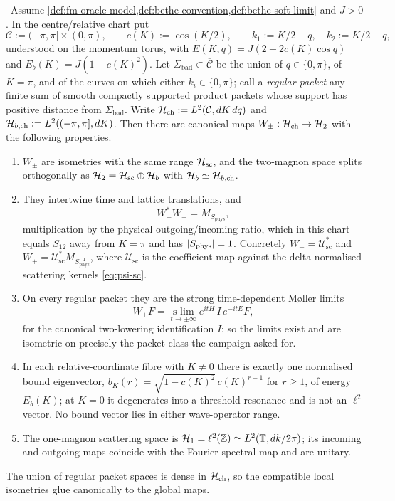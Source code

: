 \begin{theorem}
\label{thm:two-magnon-wave-operators}
\statusProved\ Assume \cref{def:fm-oracle-model,def:bethe-convention,def:bethe-soft-limit}
and $J>0$. In the centre/relative chart put
\begin{equation}
  \mathcal{C}:=(-\pi,\pi]\times(0,\pi),\qquad c(K):=\cos(K/2),\qquad
  k_1:=K/2-q,\quad k_2:=K/2+q,
\end{equation}
understood on the momentum torus, with $E(K,q)=J(2-2c(K)\cos q)$ and
$E_b(K)=J(1-c(K)^2)$. Let $\Sigma_{\mathrm{bad}}\subset\overline{\mathcal{C}}$
be the union of $q\in\{0,\pi\}$, of $K=\pi$, and of the curves on which either
$k_i\in\{0,\pi\}$; call a \emph{regular packet} any finite sum of smooth
compactly supported product packets whose support has positive distance from
$\Sigma_{\mathrm{bad}}$. Write
$\mathcal{H}_{\mathrm{ch}}:=L^2(\mathcal{C},dK\,dq)$ and
$\mathcal{H}_{b,\mathrm{ch}}:=L^2((-\pi,\pi],dK)$. Then there are canonical maps
$W_\pm:\mathcal{H}_{\mathrm{ch}}\to\mathcal{H}_2$ with the following properties.
\begin{enumerate}
\item $W_\pm$ are isometries with the same range $\mathcal{H}_{\mathrm{sc}}$, and
  the two-magnon space splits orthogonally as
  $\mathcal{H}_2=\mathcal{H}_{\mathrm{sc}}\oplus\mathcal{H}_b$ with
  $\mathcal{H}_b\simeq\mathcal{H}_{b,\mathrm{ch}}$.
\item They intertwine time and lattice translations, and
  \begin{equation}
    W_+^{*}W_-=M_{S_{\mathrm{phys}}},
    \label{eq:wpwm}
  \end{equation}
  multiplication by the physical outgoing/incoming ratio, which in this chart
  equals $S_{12}$ away from $K=\pi$ and has $\lvert S_{\mathrm{phys}}\rvert=1$.
  Concretely $W_-=\mathcal{U}_{\mathrm{sc}}^{*}$ and
  $W_+=\mathcal{U}_{\mathrm{sc}}^{*}M_{S_{\mathrm{phys}}^{-1}}$, where
  $\mathcal{U}_{\mathrm{sc}}$ is the coefficient map against the
  delta-normalised scattering kernels \cref{eq:psi-sc}.
\item On every regular packet they are the strong time-dependent M\o{}ller
  limits
  \begin{equation}
    W_\pm F=\operatorname*{s-lim}_{t\to\pm\infty}e^{itH}\,I\,e^{-itE}F ,
    \label{eq:moller}
  \end{equation}
  for the canonical two-lowering identification $I$; so the limits exist and
  are isometric on precisely the packet class the campaign asked for.
\item In each relative-coordinate fibre with $K\ne0$ there is exactly one
  normalised bound eigenvector,
  $b_K(r)=\sqrt{1-c(K)^2}\,c(K)^{r-1}$ for $r\ge1$, of energy $E_b(K)$; at
  $K=0$ it degenerates into a threshold resonance and is not an $\ell^2$
  vector. No bound vector lies in either wave-operator range.
\item The one-magnon scattering space is
  $\mathcal{H}_1=\ell^2(\mathbb{Z})\simeq L^2(\mathbb{T},dk/2\pi)$; its incoming and
  outgoing maps coincide with the Fourier spectral map and are unitary.
\end{enumerate}
The union of regular packet spaces is dense in $\mathcal{H}_{\mathrm{ch}}$, so the
compatible local isometries glue canonically to the global maps.
\end{theorem}
